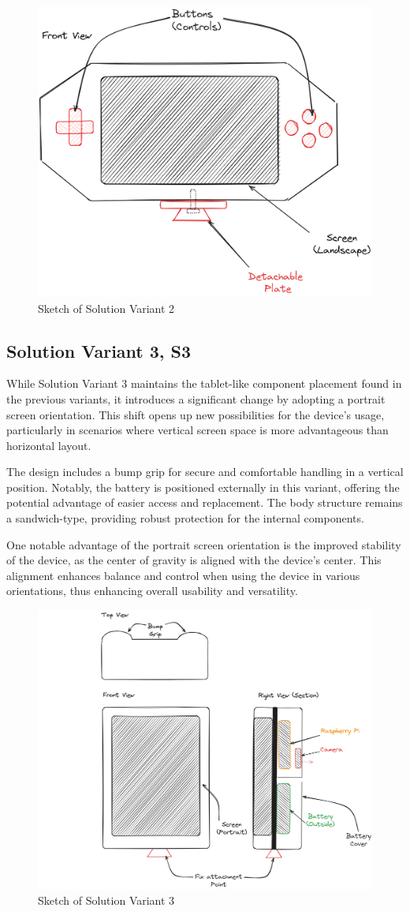 \begin{figure}[H]
    \centering
    \includegraphics[width=0.55\linewidth]{texs/Part1/chapter3/image/v2.png}
    \caption{Sketch of Solution Variant 2}
    \label{fig:sketch-solution-variant-2}
\end{figure}

\subsection{Solution Variant 3, S3}
While Solution Variant 3 maintains the tablet-like component placement found in the previous variants, it introduces a significant change by adopting a portrait screen orientation. This shift opens up new possibilities for the device's usage, particularly in scenarios where vertical screen space is more advantageous than horizontal layout.

The design includes a bump grip for secure and comfortable handling in a vertical position. Notably, the battery is positioned externally in this variant, offering the potential advantage of easier access and replacement. The body structure remains a sandwich-type, providing robust protection for the internal components.

One notable advantage of the portrait screen orientation is the improved stability of the device, as the center of gravity is aligned with the device's center. This alignment enhances balance and control when using the device in various orientations, thus enhancing overall usability and versatility.

\begin{figure}[H]
    \centering
    \includegraphics[width=0.75\linewidth]{texs/Part1/chapter3/image/v3.png}
    \caption{Sketch of Solution Variant 3}
    \label{fig:sketch-solution-variant-3}
\end{figure}

